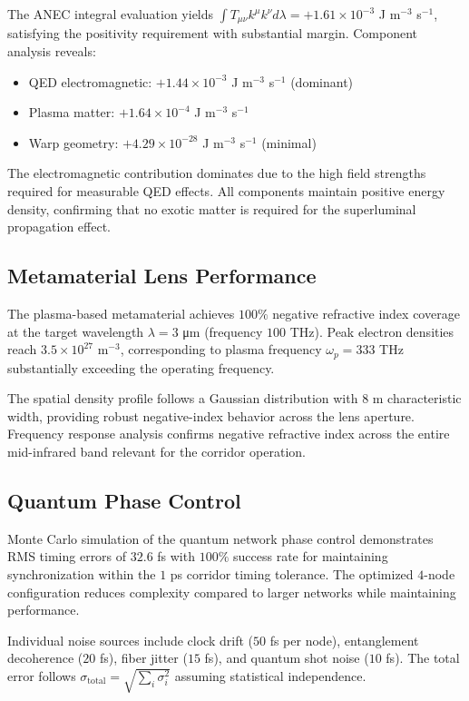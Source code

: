 \documentclass[aps,prl,reprint,groupedaddress]{revtex4-1}
\begin{document}
The ANEC integral evaluation yields $\int T_{\mu\nu} k^\mu k^\nu d\lambda = +1.61 \times 10^{-3}$ J m$^{-3}$ s$^{-1}$, satisfying the positivity requirement with substantial margin. Component analysis reveals:
\begin{itemize}
\item QED electromagnetic: $+1.44 \times 10^{-3}$ J m$^{-3}$ s$^{-1}$ (dominant)
\item Plasma matter: $+1.64 \times 10^{-4}$ J m$^{-3}$ s$^{-1}$
\item Warp geometry: $+4.29 \times 10^{-28}$ J m$^{-3}$ s$^{-1}$ (minimal)
\end{itemize}

The electromagnetic contribution dominates due to the high field strengths required for measurable QED effects. All components maintain positive energy density, confirming that no exotic matter is required for the superluminal propagation effect.

\subsection{Metamaterial Lens Performance}

The plasma-based metamaterial achieves $100\%$ negative refractive index coverage at the target wavelength $\lambda = 3$ μm (frequency $100$ THz). Peak electron densities reach $3.5 \times 10^{27}$ m$^{-3}$, corresponding to plasma frequency $\omega_p = 333$ THz substantially exceeding the operating frequency.

The spatial density profile follows a Gaussian distribution with $8$ m characteristic width, providing robust negative-index behavior across the lens aperture. Frequency response analysis confirms negative refractive index across the entire mid-infrared band relevant for the corridor operation.

\subsection{Quantum Phase Control}

Monte Carlo simulation of the quantum network phase control demonstrates RMS timing errors of $32.6$ fs with $100\%$ success rate for maintaining synchronization within the $1$ ps corridor timing tolerance. The optimized $4$-node configuration reduces complexity compared to larger networks while maintaining performance.

Individual noise sources include clock drift ($50$ fs per node), entanglement decoherence ($20$ fs), fiber jitter ($15$ fs), and quantum shot noise ($10$ fs). The total error follows $\sigma_{\text{total}} = \sqrt{\sum_i \sigma_i^2}$ assuming statistical independence.
\end{document}
